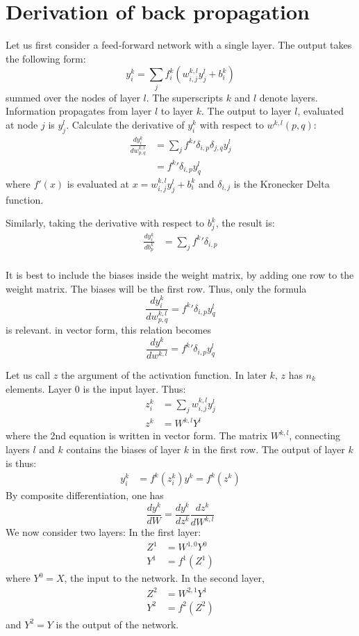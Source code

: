 \documentclass{article}
\begin{document}
\section{Derivation of back propagation}
Let us first consider a feed-forward network with a single layer. The output takes the following form: 
$$
y^k_i = \sum_{j}  f^k_i(w^{k,l}_{i,j} y^l_{j} + b^k_i)
$$
summed over the nodes of layer $l$.  The superscripts $k$ and $l$ denote layers. 
Information propagates from layer $l$ to layer $k$. The output to layer $l$, evaluated at node $j$ is $y^l_j$. 
Calculate the derivative of $y^k_i$ with respect to $w^{k,l}(p,q)$: 
\begin{align}
\frac{dy^k_i}{dw^{k,l}_{p,q}}
   &= \sum_{j} {f^k}' \delta_{i,p}\delta_{j,q} y^l_j \\
   &= {f^k}' \delta_{i,p} y^l_q
\end{align}
where $f'(x)$ is evaluated at $x=w^{k,l}_{i,j} y^l_{j} + b^k_i$ and $\delta_{i,j}$ is the Kronecker Delta function. 

Similarly, taking the derivative with respect to $b^k_j$, the result is: 
\begin{align}
\frac{dy^k_i}{db^{k}_{p}}
   &= \sum_{j} {f^k}' \delta_{i,p} \\
\end{align}

It is best to include the biases inside the weight matrix, by adding one row to the weight matrix.
The biases will be the first row. Thus, only the formula 
$$
\frac{dy^k_i}{dw^{k,l}_{p,q}} = {f^k}' \delta_{i,p} y^l_q
$$
is relevant. in vector form, this relation becomes
$$
\frac{dy^k}{dw^{k,l}} = {f^k}' \delta_{i,p} y^l_q
$$

Let us call $z$ the argument of the activation function. In later $k$, $z$ has $n_k$ elements. 
Layer 0 is the input layer. 
Thus: 
\begin{align}
z^k_i &= \sum_j w^{k,l}_{i,j} y^l_{j} \\
z^k   &=  W^{k,l} Y^l
\end{align}
where the 2nd equation is written in vector form. The matrix $W^{k,l}$, connecting layers $l$ and $k$ contains the biases
of layer $k$ in the first row. The output of layer $k$ is thus:
\begin{align}
y^k_i &= f^k(z^k_i)
y^k = f^k(z^k)
\end{align}
By composite differentiation, one has
$$
\frac{dy^k}{dW} = \frac{dy^k}{dz^k} \frac{dz^k}{dW^{k,l}}
$$
We now consider two layers: 
In the first layer: 
\begin{align}
Z^1 &=  W^{1,0} Y^0 \\
Y^1 &= f^1(Z^1)
\end{align}
where $Y^0=X$, the input to the network. 
In the second layer, 
\begin{align}
Z^2 &=  W^{2,1} Y^1 \\
Y^2 &= f^2(Z^2)
\end{align}
and $Y^2=Y$ is the output of the network. 
\end{document}
